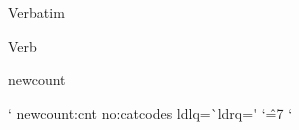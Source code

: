 \expandafter \ifx \csname Verbatim\endcsname \relax
   \def\Verbatim{\bgroup 
      \catcode`\^=10 \catcode`\\=10  \catcode`\%=10
       \catcode`\{=10    \catcode`\}=10    \catcode`\#=10     \catcode`\#=10
       \XVerbatim}
   \long\def\XVerbatim#1EndVerbatim{\egroup}
\fi

\expandafter \ifx \csname Verb\endcsname \relax
    \def\Verb{\bgroup \catcode`\^=10 \catcode`\\=10  \catcode`\%=10
       \catcode`\{=10    \catcode`\}=10    \catcode`\#=10     \catcode`\#=10
       \leavevmode \Xctgs}
    \def\Xctgs#1{\def\Xeat##1#1{\egroup}\Xeat }
\fi

\ifx \HAssign\UnDef

\csname newcount\endcsname \tmpXxXcnt

\def\advXxX#1{\def\XxXvar{#1}\futurelet\XxXtemp\AdvancXxX}
\def\AdvancXxX{\ifx [\XxXtemp \expandafter\AdvancXxXe
              \else \expandXxXafter{\expandafter\advXxXc\XxXvar}\fi}
\def\AdvancXxXe[#1]{\expandafter\advXxXc\csname
                  \expandafter\string\XxXvar[#1]\endcsname}

\def\gXxXAdvance#1{\bgroup \def\XxXtemp{#1}%
                 \tmpXxXcnt#1\afterassignment\XxXgplus \mthXxXop\tmpXxXcnt}
\def\XxXgplus{\expandafter\xdef\XxXtemp{\the\tmpXxXcnt}\egroup}
\def\XxXAdvance#1{\bgroup \def\XxXtemp{#1}%
                \tmpXxXcnt#1\afterassignment\XxXaplus \mthXxXop\tmpXxXcnt}
\def\XxXaplus{\xdef\XxXtemp{\def\expandafter\noexpand\XxXtemp{\the\tmpXxXcnt}}%
            \egroup \XxXtemp}
\def\HAssign{\XxXssg\edef}
\def\gHAssign{\XxXssg\xdef}

\def\XxXssg#1#2{\let\dXxXfn#1\def\XxXvar{#2}\futurelet\XxXtemp\XxXAssgn}
\def\XxXAssgn{%
   \ifx [\XxXtemp
         \expandafter\dXxXfn\XxXvar[##1]{%
              \noexpand\csname  \expandafter
                                  \string\XxXvar[##1]\noexpand\endcsname}%
         \expandafter\assgXxXm
   \else \afterassignment\assgXxXv \expandafter \tmpXxXcnt \fi }

\def\assgXxXv{\expandafter\dXxXfn\XxXvar{\the\tmpXxXcnt}}
\def\assgXxXm[#1]{%
   \def\XxXtemp{\expandafter\dXxXfn
      \csname \expandafter\string\XxXvar[#1]\endcsname{\the\tmpXxXcnt}}%
   \afterassignment\XxXtemp  \tmpXxXcnt}

\fi
\catcode`
\csname newcount\endcsname\tmp:cnt
\expandafter\ifx \csname no:catcodes\endcsname\relax
   \def\no:catcodes#1#2#3{%
      \tmp:cnt=#1
      \def\no::catcodes{%
         \catcode\tmp:cnt=#3
         \ifnum\tmp:cnt<#2
             \advance\tmp:cnt by 1  \expandafter\no::catcodes
         \fi }%
      \no::catcodes }
\fi
\let\:oldlq=\`
\let\:oldrq=\'
\def\'{\leavevmode \:cats  \::cats}
\def\::cats#1{\if  #1"\expandafter\:oldrq
              \else  \def\:eat##1#1{\tt ##1\egroup}\expandafter\:eat\fi}
\def\`{\leavevmode \:cats  \:::cats}
\def\:::cats#1{\if #1"\expandafter\:oldlq
               \else \def\:eat##1#1{`{\tt ##1}'\egroup}\expandafter\:eat\fi}
\bgroup
  \catcode`\^=7
  \gdef\:cats{\bgroup  \no:catcodes0{255}{12}\catcode`\ = 10
           \catcode`\^^M = 10 \catcode`\^^I = 10
  }
\egroup
\catcode`

